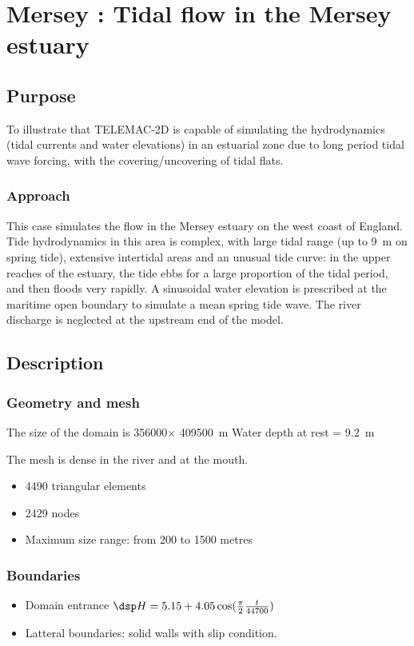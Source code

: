 \chapter{Mersey : Tidal flow in the Mersey estuary}
\section{Purpose}
To illustrate that TELEMAC-2D is capable of simulating the hydrodynamics
(tidal currents and water elevations) in an estuarial zone due to long
period tidal wave forcing, with the covering/uncovering of tidal flats.

\subsection{Approach}
This case simulates the flow in the Mersey estuary on the west coast of
England. Tide hydrodynamics in this area is complex, with large tidal
range (up to 9~m on spring tide), extensive intertidal areas and an unusual
tide curve: in the upper reaches of the estuary, the tide ebbs for a large
proportion of the tidal period, and then floods very rapidly.
A sinusoidal water elevation is prescribed at the maritime open boundary
to simulate a mean spring tide wave.
The river discharge is neglected at the upstream end of the model.

\section{Description}

\subsection{Geometry and mesh}
The size of the domain is 356000$\times$ 409500~m
Water depth at rest = 9.2~m

The mesh is dense in the river and at the mouth.
\begin{itemize}
\item 4490 triangular elements
\item 2429 nodes
\item Maximum size range: from 200 to 1500 metres
\end{itemize}

\subsection{Boundaries}
\begin{itemize}
\item Domain entrance $\dsp H=5.15+4.05\cos(\frac{\pi}{2}\frac{t}{44700}) $
\item Latteral boundaries: solid walls with slip condition.
\end{itemize}

